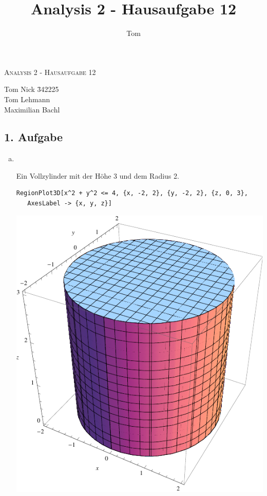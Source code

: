 \documentclass[10pt,a4paper,parskip=half]{scrartcl}
\author{Tom}
\title{Analysis 2 - Hausaufgabe 12}
\begin{document}
\begin{center}
\textsc{\Large{Analysis 2 - Hausaufgabe 12}} \\
\end{center}
\begin{tabbing}
Tom Nick \hspace{1.4cm}\= 342225\\
Tom Lehmann\\
Maximilian Bachl
\end{tabbing}
\subsection*{1. Aufgabe}
\begin{enumerate}[(a)]
   \item \ \\
   \begin{minipage}{0.50\columnwidth}
   Ein Vollzylinder mit der Höhe 3 und dem Radius 2.
   \begin{lstlisting}[caption= Mathematica Code für die Menge Z]
   RegionPlot3D[x^2 + y^2 <= 4, {x, -2, 2}, {y, -2, 2}, {z, 0, 3}, 
   AxesLabel -> {x, y, z}]
   \end{lstlisting}
   \end{minipage}
   \begin{minipage}{0.50\columnwidth}
   \begin{center}
   \includegraphics[scale=0.7]{1aZ.pdf} 

\end{center}
\end{minipage}
\end{enumerate}
\end{document}
